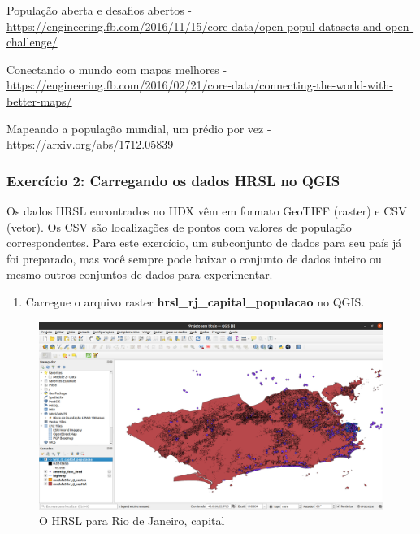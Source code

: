 \documentclass[
]{book}
\providecommand{\tightlist}{%
  \setlength{\itemsep}{0pt}\setlength{\parskip}{0pt}}
\begin{document}
População aberta e desafios abertos - \href{https://engineering.fb.com/2016/11/15/core-data/open-population-datasets-and-open-desafios/}{https://engineering.fb.com/2016/11/15/core-data/open-popul-datasets-and-open-challenge/}

Conectando o mundo com mapas melhores - \href{https://engineering.fb.com/2016/02/21/core-data/Connecting-the-world-with-better-maps/}{https://engineering.fb.com/2016/02/21/core-data/connecting-the-world-with-better-maps/}

Mapeando a população mundial, um prédio por vez - \url{https://arxiv.org/abs/1712.05839}

\hypertarget{exercuxedcio-2-carregando-os-dados-hrsl-no-qgis}{%
\subsubsection{\texorpdfstring{\textbf{Exercício 2: Carregando os dados HRSL no QGIS}}{Exercício 2: Carregando os dados HRSL no QGIS}}\label{exercuxedcio-2-carregando-os-dados-hrsl-no-qgis}}

Os dados HRSL encontrados no HDX vêm em formato GeoTIFF (raster) e CSV (vetor). Os CSV são localizações de pontos com valores de população correspondentes. Para este exercício, um subconjunto de dados para seu país já foi preparado, mas você sempre pode baixar o conjunto de dados inteiro ou mesmo outros conjuntos de dados para experimentar.

\begin{enumerate}
\def\labelenumi{\arabic{enumi}.}
\tightlist
\item
  Carregue o arquivo raster \textbf{hrsl\_rj\_capital\_populacao} no QGIS.
\end{enumerate}

\begin{figure}
\centering
\includegraphics{media/modulo3/hrsl-1.png}
\caption{O HRSL para Rio de Janeiro, capital}
\end{figure}
\end{document}
